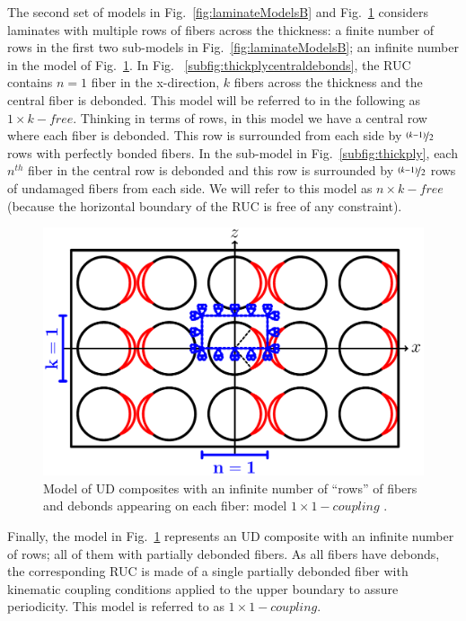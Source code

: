 \documentclass[review]{elsarticle}
\begin{document}
The second set of models in Fig.~\ref{fig:laminateModelsB} and Fig.~\ref{fig:thickplyalldebonds} considers laminates with multiple rows of fibers across the thickness: a finite number of rows in the first two sub-models in Fig.~\ref{fig:laminateModelsB}; an infinite number in the model of Fig.~\ref{fig:thickplyalldebonds}. In Fig. ~\ref{subfig:thickplycentraldebonds}, the RUC contains $n=1$ fiber in the x-direction, $k$ fibers across the thickness and the central fiber is debonded. This model will be referred to in the following as $1\times k-free$. Thinking in terms of rows, in this model we have a central row where each fiber is debonded. This row is surrounded from each side by $\nicefrac{\left(k-1\right)}{2}$ rows with perfectly bonded fibers. In the sub-model in Fig.~\ref{subfig:thickply}, each $n^{th}$ fiber in the central row is debonded and this row is surrounded by $\nicefrac{\left(k-1\right)}{2}$ rows of undamaged fibers from each side. We will refer to this model as $n\times k-free$ (because the horizontal boundary of the RUC is free of any constraint).

\begin{figure}[!h]
\centering
\includegraphics[width=\textwidth]{thickPlyAllDebonds.pdf}
\caption{Model of UD composites with an infinite number of  ``rows'' of fibers and debonds appearing on each fiber: model $1\times1-coupling$ .}\label{fig:thickplyalldebonds}
\end{figure}

Finally, the model in Fig.~\ref{fig:thickplyalldebonds} represents an UD composite with an infinite number of rows; all of them with partially debonded fibers. As all fibers have debonds, the corresponding RUC is made of a single partially debonded fiber with kinematic coupling conditions applied to the upper boundary to assure periodicity. This model is referred to as $1\times 1-coupling$.
\end{document}
